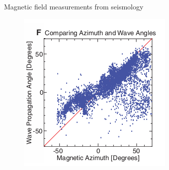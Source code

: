 \documentclass{beamer}
\begin{document}
\begin{frame}{Magnetic field measurements from seismology}
\begin{figure}[H]
\begin{minipage}[c]{0.33\textwidth}
    \includegraphics[scale=0.4]{ts3.png}
  \end{minipage}
\end{figure}

\end{frame}
\end{document}
